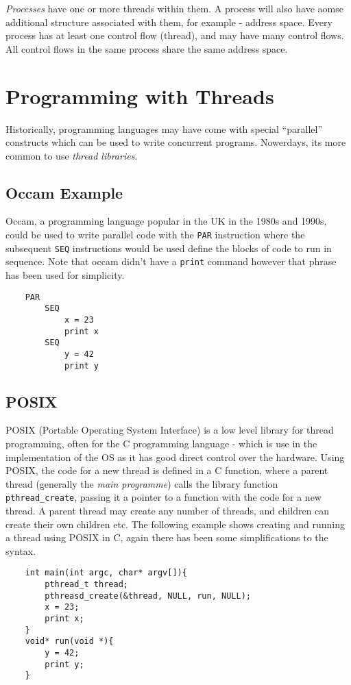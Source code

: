 \textit{Processes} have one or more threads within them. A process will also have aomse additional structure associated with them, for example - address space. Every process has at least one control flow (thread), and may have many control flows. All control flows in the same process share the same address space.

\section{Programming with Threads}
Historically, programming languages may have come with special ``parallel'' constructs which can be used to write concurrent programs. Nowerdays, its more common to use \textit{thread libraries}.
\subsection{Occam Example}
Occam, a programming language popular in the UK in the 1980s and 1990s, could be used to write parallel code with the \verb|PAR| instruction where the subsequent \verb|SEQ| instructions would be used define the blocks of code to run in sequence. Note that occam didn't have a \verb|print| command however that phrase has been used for simplicity.
\begin{verbatim}
    PAR
        SEQ
            x = 23
            print x
        SEQ
            y = 42
            print y
\end{verbatim}

\subsection{POSIX}
POSIX (Portable Operating System Interface) is a low level library for thread programming, often for the C programming language - which is use in the implementation of the OS as it has good direct control over the hardware. Using POSIX, the code for a new thread is defined in a C function, where a parent thread (generally the \textit{main programme}) calls the library function \verb|pthread_create|, passing it a pointer to a function with the code for a new thread. A parent thread may create any number of threads, and children can create their own children etc. The following example shows creating and running a thread using POSIX in C, again there has been some simplifications to the syntax.
\begin{verbatim}
    int main(int argc, char* argv[]){
        pthread_t thread;
        pthreasd_create(&thread, NULL, run, NULL);
        x = 23;
        print x;
    }
    void* run(void *){
        y = 42;
        print y;
    } 
\end{verbatim}
